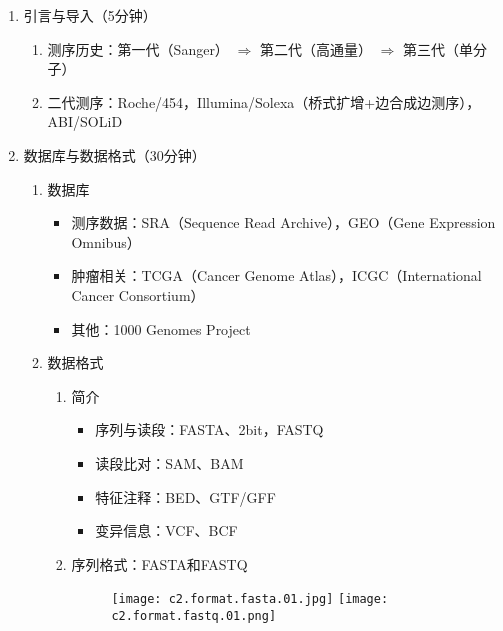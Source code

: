 \documentclass{TIJMUjiaoanLL}
\begin{document}
\begin{enumerate}
  \item 引言与导入（5分钟）
    \begin{enumerate}
      \item 测序历史：第一代（Sanger） $\Rightarrow$ 第二代（高通量） $\Rightarrow$ 第三代（单分子）
      \item 二代测序：Roche/454，Illumina/Solexa（桥式扩增+边合成边测序），ABI/SOLiD
    \end{enumerate}

  \item 数据库与数据格式（30分钟）
    \begin{enumerate}
      \item 数据库
        \begin{itemize}
          \item 测序数据：SRA（Sequence Read Archive），GEO（Gene Expression Omnibus）
          \item 肿瘤相关：TCGA（Cancer Genome Atlas），ICGC（International Cancer Consortium）
          \item 其他：1000 Genomes Project
        \end{itemize}
      \item 数据格式
        \begin{enumerate}
          \item 简介
            \begin{itemize}
              \item 序列与读段：FASTA、2bit，FASTQ
              \item 读段比对：SAM、BAM
              \item 特征注释：BED、GTF/GFF
              \item 变异信息：VCF、BCF
            \end{itemize}
          \item 序列格式：FASTA和FASTQ
            \vspace{-0.5em}
            \begin{figure}[h]
              \centering
              \texttt{[image: c2.format.fasta.01.jpg]}
              \quad
              \texttt{[image: c2.format.fastq.01.png]}
            \end{figure}
            \begin{itemize}
            \vspace{-0.5em}

\end{itemize}
\end{enumerate}
\end{enumerate}
\end{enumerate}
\end{document}
